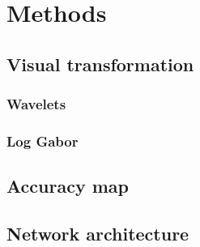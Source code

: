 \section{Methods}

\subsection{Visual transformation}
\subsubsection{Wavelets}
\subsubsection{Log Gabor}

\subsection{Accuracy map}

\subsection{Network architecture}

